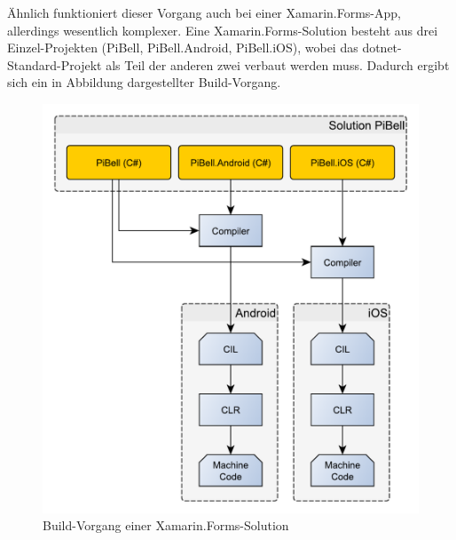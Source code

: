 Ähnlich funktioniert dieser Vorgang auch bei einer Xamarin.Forms-App, allerdings wesentlich komplexer.
Eine Xamarin.Forms-Solution besteht aus drei Einzel-Projekten (PiBell, PiBell.Android, PiBell.iOS), wobei das \ac{dotnet}-Standard-Projekt als Teil der anderen zwei verbaut werden muss.
Dadurch ergibt sich ein in Abbildung  dargestellter Build-Vorgang.
\begin{figure}
    \centering\includegraphics[width=0.9\linewidth]{images/auswahl_rahmenwerk/build-vorgang.pdf}
    \caption{Build-Vorgang einer Xamarin.Forms-Solution}
    \label{fig:build-forms}
\end{figure}

